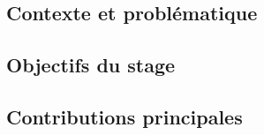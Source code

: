 

\subsection{Contexte et problématique}\label{ssec:introduction_contexte_problematique}



\subsection{Objectifs du stage}\label{ssec:introduction_objectifs}



\subsection{Contributions principales}\label{ssec:introduction_contributions}

